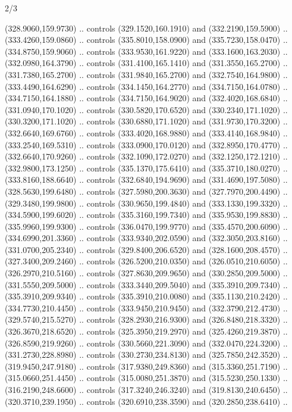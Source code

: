 \begin{flagdescription}{2/3}
\begin{scope}[xshift=0.5\flaglength,yshift=0.5\flagwidth,scale=\stretchfactor]
\begin{scope}[scale=0.001645\flagwidth,yshift=65mm,xshift=-63mm]
\begin{scope}[y=0.80pt, x=0.80pt, yscale=-1,]
\begin{scope}[cm={{1.33333,0.0,0.0,1.33333,(0.0,1e-05)}}]
  (328.9060,159.9730) .. controls (329.1520,160.1910) and (332.2190,159.5900) ..
  (333.4260,159.0860) .. controls (335.8010,158.0900) and (335.7230,158.0470) ..
  (334.8750,159.9060) .. controls (333.9530,161.9220) and (333.1600,163.2030) ..
  (332.0980,164.3790) .. controls (331.4100,165.1410) and (331.3550,165.2700) ..
  (331.7380,165.2700) .. controls (331.9840,165.2700) and (332.7540,164.9800) ..
  (333.4490,164.6290) .. controls (334.1450,164.2770) and (334.7150,164.0780) ..
  (334.7150,164.1880) .. controls (334.7150,164.9020) and (332.4020,168.6840) ..
  (331.0940,170.1020) .. controls (330.5820,170.6520) and (330.2340,171.1020) ..
  (330.3200,171.1020) .. controls (330.6880,171.1020) and (331.9730,170.3200) ..
  (332.6640,169.6760) .. controls (333.4020,168.9880) and (333.4140,168.9840) ..
  (333.2540,169.5310) .. controls (333.0900,170.0120) and (332.8950,170.4770) ..
  (332.6640,170.9260) .. controls (332.1090,172.0270) and (332.1250,172.1210) ..
  (332.9800,173.1250) .. controls (335.1370,175.6410) and (335.3710,180.0270) ..
  (333.8160,188.6640) .. controls (332.6840,194.9690) and (331.4690,197.5080) ..
  (328.5630,199.6480) .. controls (327.5980,200.3630) and (327.7970,200.4490) ..
  (329.3480,199.9800) .. controls (330.9650,199.4840) and (333.1330,199.3320) ..
  (334.5900,199.6020) .. controls (335.3160,199.7340) and (335.9530,199.8830) ..
  (335.9960,199.9300) .. controls (336.0470,199.9770) and (335.4570,200.6090) ..
  (334.6990,201.3360) .. controls (333.9340,202.0590) and (332.3050,203.8160) ..
  (331.0700,205.2340) .. controls (329.8400,206.6520) and (328.1600,208.4570) ..
  (327.3400,209.2460) .. controls (326.5200,210.0350) and (326.0510,210.6050) ..
  (326.2970,210.5160) .. controls (327.8630,209.9650) and (330.2850,209.5000) ..
  (331.5550,209.5000) .. controls (333.3440,209.5040) and (335.3910,209.7340) ..
  (335.3910,209.9340) .. controls (335.3910,210.0080) and (335.1130,210.2420) ..
  (334.7730,210.4450) .. controls (333.9450,210.9450) and (332.3790,212.4730) ..
  (329.5740,215.5270) .. controls (328.2930,216.9300) and (326.8480,218.3320) ..
  (326.3670,218.6520) .. controls (325.3950,219.2970) and (325.4260,219.3870) ..
  (326.8590,219.9260) .. controls (330.5660,221.3090) and (332.0470,224.3200) ..
  (331.2730,228.8980) .. controls (330.2730,234.8130) and (325.7850,242.3520) ..
  (319.9450,247.9180) .. controls (317.9380,249.8360) and (315.3360,251.7190) ..
  (315.0660,251.4450) .. controls (315.0080,251.3870) and (315.5230,250.1330) ..
  (316.2190,248.6600) .. controls (317.3240,246.3240) and (319.8130,240.6450) ..
  (320.3710,239.1950) .. controls (320.6910,238.3590) and (320.2850,238.6410) ..

\end{scope}
\end{scope}
\end{scope}
\end{scope}
\end{flagdescription}
